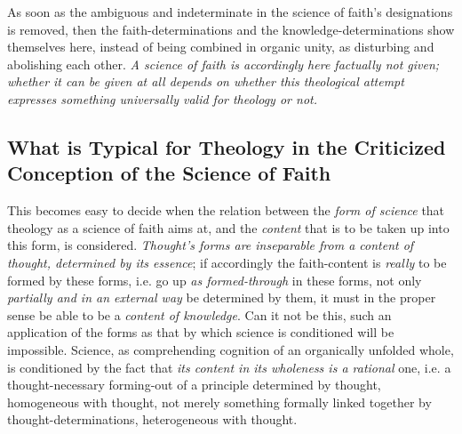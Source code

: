 \documentclass[12pt,a4paper]{book}
\begin{document}
As soon as the ambiguous and indeterminate in the science of faith's designations is removed,
then the faith-determinations and the knowledge-determinations show themselves here, instead
of being combined in organic unity, as disturbing and abolishing each other. \emph{A science
of faith is accordingly here factually not given; whether it can be given at all depends on
whether this theological attempt expresses something universally valid for theology or not.}

\subsection{What is Typical for Theology in the Criticized Conception
  of the Science of Faith}
\label{ssec:typical-faith-science}

This becomes easy to decide when the relation between the \emph{form of science} that theology
as a science of faith aims at, and the \emph{content} that is to be taken up into this form, is
considered. \emph{Thought's forms are inseparable from a content of thought, determined by
its essence}; if accordingly the faith-content is \emph{really} to be formed by these forms, i.e.
go up \emph{as formed-through} in these forms, not only \emph{partially and in an external way} be
determined by them, it must in the proper sense be able to be a \emph{content of
knowledge}. Can it not be this, such an application of the forms as that by which science
is conditioned will be impossible. Science, as comprehending cognition of an organically
unfolded whole, is conditioned by the fact that \emph{its content in its wholeness is a
rational} one, i.e. a thought-necessary forming-out of a principle determined by
thought, homogeneous with thought, not merely something formally linked together by
thought-determinations, heterogeneous with thought.
\end{document}
